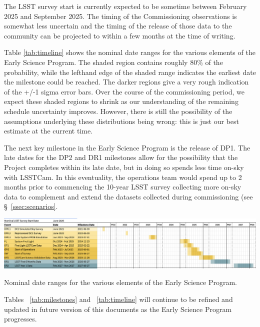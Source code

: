 The LSST survey start is currently expected to be sometime between February 2025 and September 2025.
The timing of the Commissioning observations is somewhat less uncertain and the timing of the release of those data to the community can be projected to within a few months at the time of writing.

Table \ref{tab:timeline} shows the nominal date ranges for the various elements of the Early Science Program. 
The shaded region contains roughly 80\% of the probability, while the lefthand edge of the shaded range indicates the earliest date the milestone could be reached. 
The darker regions give a very rough indication of the +/-1 sigma error bars. 
Over the course of the commissioning period, we expect these shaded regions to shrink as our understanding of the remaining schedule uncertainty improves. 
However, there is still the possibility of the assumptions underlying these distributions being wrong: this is just our best estimate at the current time.

The next key milestone in the Early Science Program is the release of DP1.
The late dates for the DP2 and DR1 milestones allow for the possibility that the Project completes within its late date, but in doing so spends less time on-sky with LSSTCam.
In this eventuality, the operations team would spend up to 2 months prior to commencing the 10-year LSST survey collecting more on-sky data to complement and extend the datasets collected during commissioning (see \S~\ref{ssec:scenarios}. 
\begin{table}[ht]
\centering
\includegraphics[width=\linewidth]{figures/DPR-timeline}
\caption{Nominal date ranges for the various elements of the Early Science Program.}
\label{tab:timeline}
\end{table}

Tables ~\ref{tab:milestones} and ~\ref{tab:timeline} will continue to be refined and updated in future version of this documents as the Early Science Program progresses.
